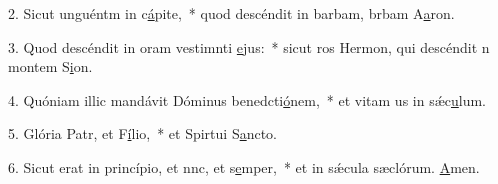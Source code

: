 2. Sicut unguéntm in c\uline{á}pite,~* quod descéndit in barbam, brbam A\uline{a}ron.\par 
3. Quod descéndit in oram vestimnti \uline{e}jus:~* sicut ros Hermon, qui descéndit n montem S\uline{i}on.\par 
4. Quóniam illic mandávit Dóminus benedcti\uline{ó}nem,~* et vitam us in sǽc\uline{u}lum.\par 
5. Glória Patr, et F\uline{í}lio,~* et Spirtui S\uline{a}ncto.\par 
6. Sicut erat in princípio, et nnc, et s\uline{e}mper,~* et in sǽcula sæclórum. \uline{A}men.\par 
